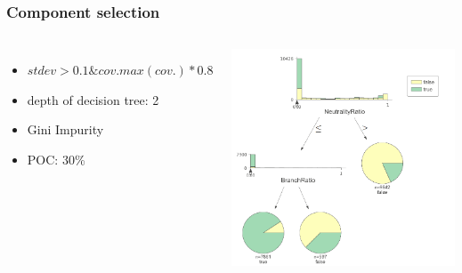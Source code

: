 \begin{frame}
	\frametitle{Component selection}
	
	\begin{columns}[c]
		
		
		\begin{itemize}
			\item $stdev > 0.1 \& cov. max(cov.) * 0.8$
			\item depth of decision tree: 2
			\item Gini Impurity
			\item POC: 30\%
		\end{itemize}
		
		\includegraphics[height=0.8\textheight]{figures/decision_tree}
		
	\end{columns}
	
	
\end{frame}